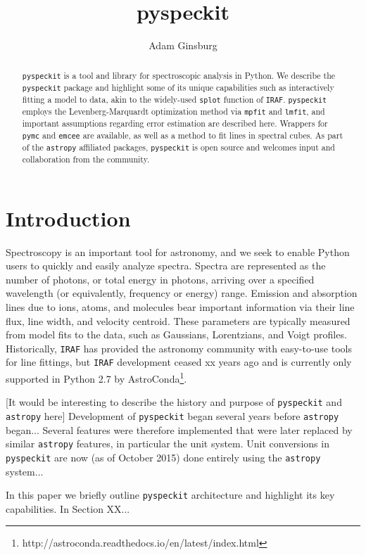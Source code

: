 \documentclass[twocolumn]{aastex61}
\newcommand{\pyspeckit}{\texttt{pyspeckit}\xspace}
\newcommand{\astropy}{\texttt{astropy}\xspace}
\begin{document}
\title{pyspeckit}

\author[0000-0001-6431-9633]{Adam Ginsburg}


\begin{abstract}
\pyspeckit is a tool and library for spectroscopic analysis in Python. We describe the
\pyspeckit package and highlight some of its unique capabilities such as
interactively fitting a model to data, akin to the widely-used \texttt{splot} function
of \texttt{IRAF}. \pyspeckit employs the Levenberg-Marquardt optimization method 
via \texttt{mpfit} and \texttt{lmfit}, and important assumptions regarding error estimation 
are described here. Wrappers for \texttt{pymc} and \texttt{emcee} are available, as well as a 
method to fit lines in spectral cubes. As part of the \astropy affiliated packages, 
\pyspeckit is open source and welcomes input and collaboration from the community.
\end{abstract}


\section{Introduction}
Spectroscopy is an important tool for astronomy, and we seek to enable Python users
to quickly and easily analyze spectra.  Spectra are represented as
the number of photons, or total energy in photons, arriving over a specified
wavelength (or equivalently, frequency or energy) range. Emission and 
absorption lines due to ions, atoms, and molecules bear important information
via their line flux, line width, and velocity centroid. These parameters
are typically measured from model fits to the data, such as Gaussians, Lorentzians, and Voigt
profiles. Historically, \texttt{IRAF} has provided the astronomy community with easy-to-use
tools for line fittings, but \texttt{IRAF} development ceased xx years ago
and is currently only supported in Python 2.7 by AstroConda\footnote{http://astroconda.readthedocs.io/en/latest/index.html}.

[It would be interesting to describe the history and purpose of \pyspeckit and \astropy here] 
Development of \pyspeckit began several years before \astropy began...  Several
features were therefore implemented that were later replaced by similar
\astropy features, in particular the unit system.  Unit conversions in
\pyspeckit are now (as of October 2015) done entirely using the \astropy
system...

In this paper we briefly outline \texttt{pyspeckit} architecture and highlight its key 
capabilities. In Section XX...
\end{document}
